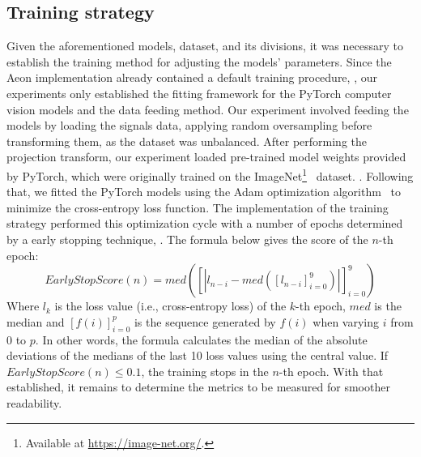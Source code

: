 \subsection{Training strategy}

Given the aforementioned models, dataset, and its divisions, it was necessary to establish the training method for adjusting the models' parameters. Since the Aeon implementation already contained a default training procedure, , our experiments only established the fitting framework for the PyTorch computer vision models and the data feeding method. Our experiment involved feeding the models by loading the signals data, applying random oversampling before transforming them, as the dataset was unbalanced. After performing the projection transform, our experiment loaded pre-trained model weights provided by PyTorch, which were originally trained on the ImageNet\footnote{Available at \url{https://image-net.org/}.}~\cite{ImageNet} dataset. . Following that, we fitted the PyTorch models using the Adam optimization algorithm~\cite{Adam} to minimize the cross-entropy loss function.  The implementation of the training strategy performed this optimization cycle with a number of epochs determined by a  early stopping technique, . The formula below gives the score of the $n$-th epoch:
\begin{equation}
EarlyStopScore(n) = med([|l_{n-i} - med([l_{n-i}]_{i=0}^9)|]_{i=0}^{9})
\end{equation}
\noindent Where $l_k$ is the loss value (i.e., cross-entropy loss) of the $k$-th epoch, ${med}$ is the median and $[f(i)]_{i=0}^p$ is the sequence generated by $f(i)$ when varying $i$ from $0$ to $p$. In other words, the formula calculates the median of the absolute deviations of the medians of the last 10 loss values using the central value. If $EarlyStopScore(n) \leq 0.1$, the training stops in the $n$-th epoch. With that established, it remains to determine the metrics to be measured for smoother readability.

